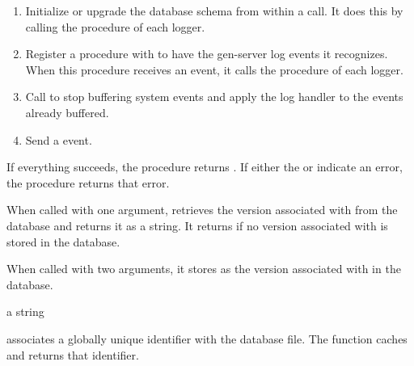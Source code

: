 \begin{enumerate}
  \item Initialize or upgrade the database schema from within a
     call. It does this by calling the
     procedure of each logger.
  \item Register a procedure with  to
    have the  gen-server log events it recognizes. When
    this procedure receives an event, it calls the 
    procedure of each logger.
  \item Call  to stop buffering system
    events and apply the log handler to the events already buffered.
  \item Send a  event.
\end{enumerate}

If everything succeeds, the procedure returns . If
either the  or
 indicate an error, the procedure
returns that error.

\begin{procedure}
\end{procedure}

\begin{argtbl}
\end{argtbl}

When called with one argument,  retrieves the
version associated with  from the database and returns it as
a string. It returns  if no version associated with
 is stored in the database.

When called with two arguments, it stores  as the version
associated with  in the database.

\begin{procedure}
\end{procedure}

\returns{} a string

 associates a globally unique identifier with the
database file. The  function caches and
returns that identifier.

\begin{property}
\end{property}

